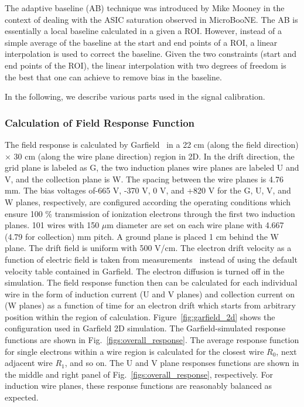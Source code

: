 The adaptive baseline (AB) technique was introduced by 
Mike Mooney in the context of dealing with the ASIC saturation observed in MicroBooNE.
The AB is essentially a local baseline calculated in a given a ROI. However, instead of 
a simple average of the baseline at the start and end points of a ROI, a linear
interpolation is used to correct the baseline. Given the two constraints (start and 
end points of the ROI), the linear interpolation with two degrees of freedom is the best 
that one can achieve to  remove bias in the baseline. 



In the following, we describe various parts used in the signal calibration.

\subsubsection{Calculation of Field Response Function}

The field response is calculated by Garfield~\cite{garfield} in a 22 cm (along the 
field direction) $\times$ 30 cm (along the wire plane direction) region in 2D.  
In the drift direction, the grid plane is labeled as G, the two induction planes wire 
planes are labeled U and V, and the collection plane is W.  The spacing between the wire 
planes is 4.76 mm. The bias voltages of-665 V, -370 V, 0 V, and +820 V for the G, U, V, and 
W planes, respectively, are configured according the operating conditions which ensure 100 \%
    transmission of ionization electrons through the first two induction planes.  
    101 wires with 150 $\mu$m diameter are set on each wire plane with 4.667 (4.79 for collection) mm
    pitch.  A ground plane is placed 1 cm behind the W plane.  The drift
    field is uniform with 500 V/cm. The electron drift velocity as a function of
    electric field is taken from measurements~\cite{Li:2015rqa,lar_property}
    instead of using the default velocity table contained in Garfield. The electron
    diffusion is turned off in the simulation. The field response function then can
    be calculated for each individual wire in the form of induction current 
    (U and V planes) and collection current on (W planes) as a function of time for
    an electron drift which starts from arbitrary position within the region of calculation.
    Figure~\ref{fig:garfield_2d} shows the configuration used in Garfield 2D simulation.
The Garfield-simulated response functions are shown in Fig.~\ref{figs:overall_response}.
 The average response function for single electrons within a wire region 
is calculated for the closest wire $R_0$, next adjacent wire $R_1$, and so on. The U and 
V plane responses functions are shown in the middle and right panel of 
Fig.~\ref{figs:overall_response}, respectively.  For induction wire planes, these response 
functions are reasonably balanced as expected.


